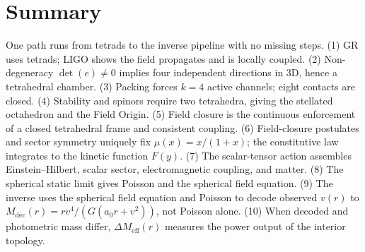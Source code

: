 \documentclass[aps,twocolumn,amsmath,amssymb,reprint,nofootinbib,nobalancelastpage]{revtex4-2}
\begin{document}
\section{Summary}
\label{sec:summary}

One path runs from tetrads to the inverse pipeline with no missing steps. (1) GR uses tetrads; LIGO shows the field propagates and is locally coupled. (2) Non-degeneracy $\det(e)\neq 0$ implies four independent directions in 3D, hence a tetrahedral chamber. (3) Packing forces $k=4$ active channels; eight contacts are closed. (4) Stability and spinors require two tetrahedra, giving the stellated octahedron and the Field Origin. (5) Field closure is the continuous enforcement of a closed tetrahedral frame and consistent coupling. (6) Field-closure postulates and sector symmetry uniquely fix $\mu(x)=x/(1+x)$; the constitutive law integrates to the kinetic function $F(y)$. (7) The scalar-tensor action assembles Einstein--Hilbert, scalar sector, electromagnetic coupling, and matter. (8) The spherical static limit gives Poisson and the spherical field equation. (9) The inverse uses the spherical field equation and Poisson to decode observed $v(r)$ to $M_{\mathrm{dec}}(r) = r v^4 / (G(a_0 r + v^2))$, not Poisson alone. (10) When decoded and photometric mass differ, $\Delta M_{\mathrm{eff}}(r)$ measures the power output of the interior topology.


\end{document}
